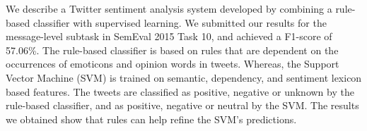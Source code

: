 We describe a Twitter sentiment analysis system developed by combining a rule-based classifier with supervised learning. We submitted our results for the message-level subtask in SemEval 2015 Task 10, and achieved a F1-score of 57.06\%. The rule-based classifier is based on rules that are dependent on the occurrences of emoticons and opinion words in tweets. Whereas, the Support Vector Machine (SVM) is trained on semantic, dependency, and sentiment lexicon based features. The tweets are classified as positive, negative or unknown by the rule-based classifier, and as positive, negative or neutral by the SVM. The results we obtained show that rules can help refine the SVM's predictions.
